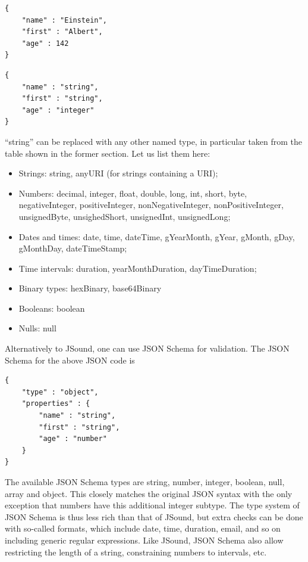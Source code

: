 \begin{minipage}{0.45\textwidth}
\begin{lstlisting}[style=json,caption={JSON Code}]
{
    "name" : "Einstein",
    "first" : "Albert",
    "age" : 142
}
\end{lstlisting}
\end{minipage}
\hfill
\begin{minipage}{0.45\textwidth}
\begin{lstlisting}[style=json,caption={JSOUND Schema}]
{
    "name" : "string",
    "first" : "string",
    "age" : "integer"
}
\end{lstlisting}
\end{minipage}
“string” can be replaced with any other named type, in particular taken from the table shown in the former section. Let us list them here:
\begin{itemize}
    \item Strings: string, anyURI (for strings containing a URI);
    \item Numbers: decimal, integer, float, double, long, int, short, byte, negativeInteger, positiveInteger, nonNegativeInteger, nonPositiveInteger, unsignedByte, unsighedShort, unsignedInt, unsignedLong;
    \item Dates and times: date, time, dateTime, gYearMonth, gYear, gMonth, gDay, gMonthDay, dateTimeStamp;
    \item Time intervals: duration, yearMonthDuration, dayTimeDuration;
    \item Binary types: hexBinary, base64Binary
    \item Booleans: boolean
    \item Nulls: null
\end{itemize}
Alternatively to JSound, one can use JSON Schema for validation. The JSON Schema for the above JSON code is
\begin{lstlisting}[style=json,caption={Schema}]
{
    "type" : "object",
    "properties" : {
        "name" : "string",
        "first" : "string",
        "age" : "number"
    }
}
\end{lstlisting}
The available JSON Schema types are string, number, integer, boolean, null, array and object. This closely matches the original JSON syntax with the only exception that numbers have this additional integer subtype. The type system of JSON Schema is thus less rich than that of JSound, but extra checks can be done with so-called formats, which include date, time, duration, email, and so on including generic regular expressions. Like JSound, JSON Schema also allow restricting the length of a string, constraining numbers to intervals, etc.

